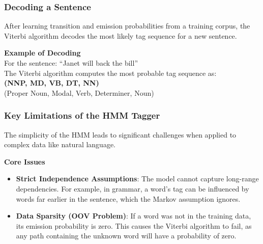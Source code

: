 \documentclass[aspectratio=43, 9pt]{beamer}
\begin{document}
\begin{frame}
    \frametitle{Decoding a Sentence}
    After learning transition and emission probabilities from a training corpus, the Viterbi algorithm decodes the most likely tag sequence for a new sentence.
    
    \vspace{1em}
    
    \begin{Takeaway}
        \textbf{Example of Decoding} \\
        For the sentence: “Janet will back the bill” \\
        The Viterbi algorithm computes the most probable tag sequence as: \\
        \textbf{(NNP, MD, VB, DT, NN)} \\
        (Proper Noun, Modal, Verb, Determiner, Noun)
    \end{Takeaway}
\end{frame}

\begin{frame}
    \frametitle{Key Limitations of the HMM Tagger}
    The simplicity of the HMM leads to significant challenges when applied to complex data like natural language.
    
    \vspace{1em}
    
    \begin{Takeaway}
        \textbf{Core Issues}
        \begin{itemize}
            \item \textbf{Strict Independence Assumptions}: The model cannot capture long-range dependencies. For example, in grammar, a word's tag can be influenced by words far earlier in the sentence, which the Markov assumption ignores.
            
            \vspace{0.5em}
            
            \item \textbf{Data Sparsity (OOV Problem)}: If a word was not in the training data, its emission probability is zero. This causes the Viterbi algorithm to fail, as any path containing the unknown word will have a probability of zero.
        \end{itemize}
    \end{Takeaway}
\end{frame}
\end{document}
